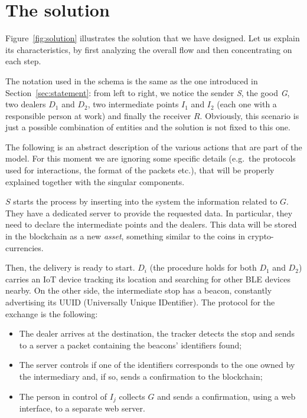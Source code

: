 \chapter{The solution}
\label{cha:main}

Figure~\ref{fig:solution} illustrates the solution that we have designed. Let us explain its characteristics, by first analyzing the overall flow and then concentrating on each step.

The notation used in the schema is the same as the one introduced in Section~\ref{sec:statement}: from left to right, we notice the sender \textit{S}, the good \textit{G}, two dealers $D_1$ and $D_2$, two intermediate points $I_1$ and $I_2$ (each one with a responsible person at work) and finally the receiver $R$. Obviously, this scenario is just a possible combination of entities and the solution is not fixed to this one.

The following is an abstract description of the various actions that are part of the model. For this moment we are ignoring some specific details (e.g.\ the protocols used for interactions, the format of the packets etc.), that will be properly explained together with the singular components.

$S$ starts the process by inserting into the system the information related to $G$. They have a dedicated server to provide the requested data. In particular, they need to declare the intermediate points and the dealers. This data will be stored in the blockchain as a new \emph{asset}, something similar to the coins in crypto-currencies. 

Then, the delivery is ready to start. $D_i$ (the procedure holds for both $D_1$ and $D_2$) carries an IoT device tracking its location and searching for other BLE devices nearby. On the other side, the intermediate stop has a beacon, constantly advertising its UUID (Universally Unique IDentifier). The protocol for the exchange is the following: 
\begin{itemize}
    \item The dealer arrives at the destination, the tracker detects the stop and sends to a server a packet containing the beacons' identifiers found;
    \item The server controls if one of the identifiers corresponds to the one owned by the intermediary and, if so, sends a confirmation to the blockchain;
    \item The person in control of $I_j$ collects $G$ and sends a confirmation, using a web interface, to a separate web server.
\end{itemize}

